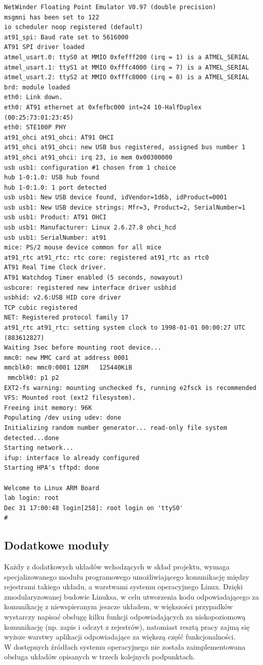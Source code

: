 \documentclass[a4paper,12pt]{book}
\begin{document}
\begin{lstlisting}[basicstyle={\footnotesize\ttfamily}]
NetWinder Floating Point Emulator V0.97 (double precision)
msgmni has been set to 122
io scheduler noop registered (default)
at91_spi: Baud rate set to 5616000
AT91 SPI driver loaded
atmel_usart.0: ttyS0 at MMIO 0xfefff200 (irq = 1) is a ATMEL_SERIAL
atmel_usart.1: ttyS1 at MMIO 0xfffc4000 (irq = 7) is a ATMEL_SERIAL
atmel_usart.2: ttyS2 at MMIO 0xfffc8000 (irq = 8) is a ATMEL_SERIAL
brd: module loaded
eth0: Link down.
eth0: AT91 ethernet at 0xfefbc000 int=24 10-HalfDuplex (00:25:73:01:23:45)
eth0: STE100P PHY
at91_ohci at91_ohci: AT91 OHCI
at91_ohci at91_ohci: new USB bus registered, assigned bus number 1
at91_ohci at91_ohci: irq 23, io mem 0x00300000
usb usb1: configuration #1 chosen from 1 choice
hub 1-0:1.0: USB hub found
hub 1-0:1.0: 1 port detected
usb usb1: New USB device found, idVendor=1d6b, idProduct=0001
usb usb1: New USB device strings: Mfr=3, Product=2, SerialNumber=1
usb usb1: Product: AT91 OHCI
usb usb1: Manufacturer: Linux 2.6.27.8 ohci_hcd
usb usb1: SerialNumber: at91
mice: PS/2 mouse device common for all mice
at91_rtc at91_rtc: rtc core: registered at91_rtc as rtc0
AT91 Real Time Clock driver.
AT91 Watchdog Timer enabled (5 seconds, nowayout)
usbcore: registered new interface driver usbhid
usbhid: v2.6:USB HID core driver
TCP cubic registered
NET: Registered protocol family 17
at91_rtc at91_rtc: setting system clock to 1998-01-01 00:00:27 UTC 
(883612827)
Waiting 3sec before mounting root device...
mmc0: new MMC card at address 0001
mmcblk0: mmc0:0001 128M   125440KiB 
 mmcblk0: p1 p2
EXT2-fs warning: mounting unchecked fs, running e2fsck is recommended
VFS: Mounted root (ext2 filesystem).
Freeing init memory: 96K
Populating /dev using udev: done
Initializing random number generator... read-only file system 
detected...done
Starting network...
ifup: interface lo already configured
Starting HPA's tftpd: done

Welcome to Linux ARM Board
lab login: root
Dec 31 17:00:48 login[258]: root login on 'ttyS0'
# 
				\end{lstlisting}
				
			\subsection{Dodatkowe moduły}
				\label{sec:linux_modules}
				Każdy z dodatkowych układów wchodzących w skład projektu, wymaga specjalizowanego modułu programowego umożliwiającego komunikację między rejestrami takiego układu, a warstwami systemu operacyjnego Linux. Dzięki zmodularyzowanej budowie Linuksa, w celu utworzenia kodu odpowiadającego za komunikację z niewspieranym jeszcze układem, w większości przypadków wystarczy napisać obsługę kilku funkcji odpowiadających za niskopoziomową komunikację (np. zapis i odczyt z rejestrów), natomiast resztą pracy zajmą się wyższe warstwy aplikacji odpowiadające za większą część funkcjonalności.\\
				W dostępnych źródłach systemu operacyjnego nie została zaimplementowana obsługa układów opisanych w trzech kolejnych podpunktach.
				
\end{document}
